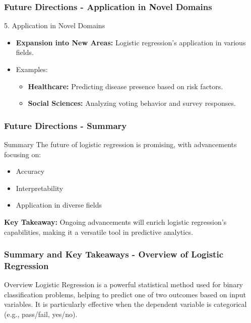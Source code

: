 \documentclass[aspectratio=169]{beamer}
\begin{document}
\begin{frame}[fragile]
    \frametitle{Future Directions - Application in Novel Domains}
    \begin{block}{5. Application in Novel Domains}
        \begin{itemize}
            \item \textbf{Expansion into New Areas:} Logistic regression's application in various fields.
            \item Examples:
                \begin{itemize}
                    \item \textbf{Healthcare:} Predicting disease presence based on risk factors.
                    \item \textbf{Social Sciences:} Analyzing voting behavior and survey responses.
                \end{itemize}
        \end{itemize}
    \end{block}
\end{frame}

\begin{frame}[fragile]
    \frametitle{Future Directions - Summary}
    \begin{block}{Summary}
        The future of logistic regression is promising, with advancements focusing on:
        \begin{itemize}
            \item Accuracy
            \item Interpretability
            \item Application in diverse fields
        \end{itemize}
    \end{block}
    \textbf{Key Takeaway:} Ongoing advancements will enrich logistic regression's capabilities, making it a versatile tool in predictive analytics.
\end{frame}

\begin{frame}[fragile]
    \frametitle{Summary and Key Takeaways - Overview of Logistic Regression}
    \begin{block}{Overview}
        Logistic Regression is a powerful statistical method used for binary classification problems, helping to predict one of two outcomes based on input variables. 
        It is particularly effective when the dependent variable is categorical (e.g., pass/fail, yes/no).
    \end{block}
\end{frame}
\end{document}
